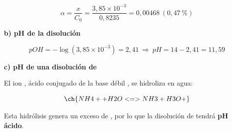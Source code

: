 \begin{exerciseEVAU}
\begin{solu}
        \begin{equation*}
            \alpha = \dfrac{x}{C_0} = \dfrac{3,85\times10^{-3}}{0,8235} = 0,00468 \ (0,47\ \%)
        \end{equation*}

        \textbf{b) pH de la disolución}

        \begin{equation*}
            pOH = -\log(3,85\times10^{-3}) = 2,41 \ \Rightarrow \ pH = 14-2,41 = 11,59
        \end{equation*}

        \textbf{c) pH de una disolución de }

        El ion , ácido conjugado de la base débil , se hidroliza en agua:

        \begin{equation*}
            \ch{NH4+ + H2O <=> NH3 + H3O+}
        \end{equation*}

        Esta hidrólisis genera un exceso de , por lo que la disolución de  tendrá \textbf{pH ácido}.

    \end{solu}
\end{exerciseEVAU}

